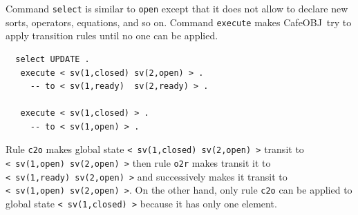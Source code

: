 \documentclass[12pt]{report}
\newcommand{\stt}[1]{{\small{\tt {#1}}}}
\newcommand{\cafeobj}{{\sf CafeOBJ}~}
\begin{document}
Command {\tt select} is similar to {\tt open} except that it does not
allow to declare new sorts, operators, equations, and so on. 
Command {\tt execute} makes \cafeobj try to apply transition
rules until no one can be applied.
\small
\begin{verbatim}
  select UPDATE .
   execute < sv(1,closed) sv(2,open) > .
     -- to < sv(1,ready)  sv(2,ready) > .

   execute < sv(1,closed) > .
     -- to < sv(1,open) > .
\end{verbatim}
\normalsize
Rule {\tt c2o} makes global state \stt{<~sv(1,closed)~sv(2,open)~>} transit
to \stt{<~sv(1,open)~sv(2,open)~>} then rule {\tt o2r} makes transit
it to \stt{<~sv(1,ready)~sv(2,open)~>} and successively makes it
transit to \stt{<~sv(1,open)~sv(2,open)~>}. On the other hand,
only rule {\tt c2o} can be applied to global state \stt{<~sv(1,closed)~>}
because it has only one element.

\end{document}
